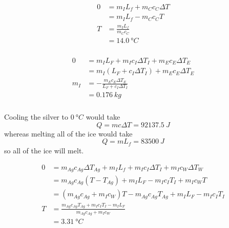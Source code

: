 \documentclass{article}
\begin{document}
\subsubsection{}

\begin{align*}
  0 & = m_I L_f + m_C c_C \Delta T \\
    & = m_I L_f - m_C c_C T        \\
  T & = \frac{m_I L_f}{m_C c_C}    \\
    & = \qty{14.0}{\degree C}
\end{align*}

\subsubsection{}

\begin{align*}
  0   & = m_I L_F + m_I c_I \Delta T_I + m_E c_E \Delta T_E \\
      & = m_I (L_F + c_I \Delta T_I) + m_E c_E \Delta T_E   \\
  m_I & = -\frac{m_E c_E \Delta T_E}{L_F + c_I \Delta T_I}  \\
      & = \qty{0.176}{kg}
\end{align*}

\subsubsection{}

Cooling the silver to $\qty{0}{\degree C}$ would take \[Q = m c \Delta T = \qty{92137.5}{J}\] whereas melting all of the ice would take \[Q = m L_f = \qty{83500}{J}\] so all of the ice will melt.

\begin{align*}
  0 & = m_{Ag} c_{Ag} \Delta T_{Ag} + m_I L_f + m_I c_I \Delta T_I + m_I c_W \Delta T_W \\
    & = m_{Ag} c_{Ag} (T - T_{Ag}) + m_I L_F - m_I c_I T_I + m_I c_W T                  \\
    & = (m_{Ag} c_{Ag} + m_I c_W) T - m_{Ag} c_{Ag} T_{Ag} + m_I L_F - m_I c_I T_I      \\
  T & = \frac{m_{Ag} c_{Ag} T_{Ag} + m_I c_I T_I - m_I L_F}{m_{Ag} c_{Ag} + m_I c_W}    \\
    & = \qty{3.31}{\degree C}
\end{align*}

\subsubsection{}
\end{document}
